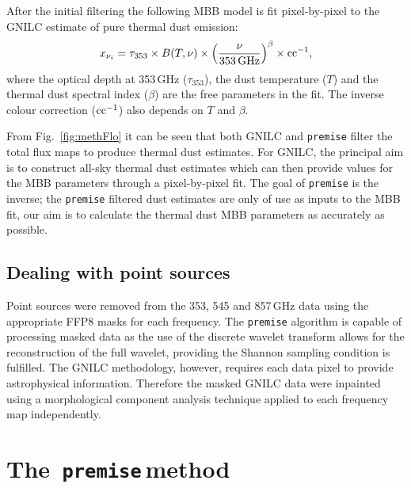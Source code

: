 \documentclass[a4paper,fleqn,usenatbib]{mnras}
\newcommand{\premise}{\texttt{premise}}
\begin{document}
After the initial filtering the following MBB model is fit pixel-by-pixel to the GNILC estimate of pure thermal dust emission: 
\begin{eqnarray}
x_{\nu_{i}} = \tau_{353} \times B(T,  \nu) \times \left(\frac{\nu}{353 \, \rm{GHz}}\right)^{\beta} \times \rm{cc}^{-1},
\end{eqnarray}
where the optical depth at 353\,GHz ($\tau_{353}$), the dust temperature ($T$) and the thermal dust spectral index ($\beta$) are the free parameters in the fit. The inverse colour correction ($\rm{cc}^{-1}$) also depends on $T$ and $\beta$.

From Fig.~\ref{fig:methFlo} it can be seen that both GNILC and {\texttt{premise}} filter the total flux maps to produce thermal dust estimates. For GNILC, the principal aim is to construct all-sky thermal dust estimates which can then provide values for the MBB parameters through a pixel-by-pixel fit. The goal of {\texttt{premise}} is the inverse; the {\texttt{premise}} filtered dust estimates are only of use as inputs to the MBB fit, our aim is to calculate the thermal dust MBB parameters as accurately as possible. 

\subsection{Dealing with point sources} \label{scontrib}

Point sources were removed from the 353, 545 and 857\,GHz data using the appropriate FFP8 masks for each frequency. The {\texttt{premise}} algorithm is capable of processing masked data as the use of the discrete wavelet transform allows for the reconstruction of the full wavelet, providing the Shannon sampling condition is fulfilled. The GNILC methodology, however, requires each data pixel to provide astrophysical information. Therefore the masked GNILC data were inpainted using a morphological component analysis technique \citep{inpaint} applied to each frequency map independently.   

\section{The\, \premise \,method}
\label{sec:method}
\end{document}
